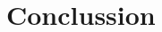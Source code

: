 \doublespacing %

\chapter{Conclussion}
\label{ch5}

\begin{spacing}{1} %
\minitoc %
\end{spacing} %
\thesisspacing %



% 


% 


% 


% 
